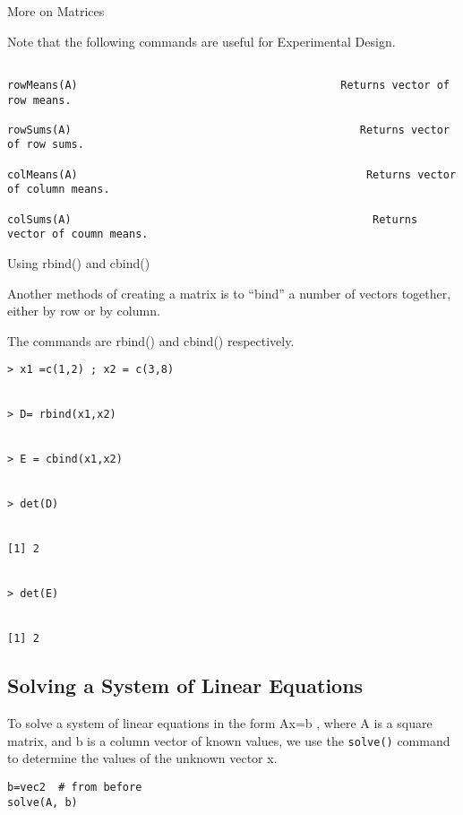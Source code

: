 More on Matrices

 

Note that the following commands are useful for Experimental Design.

 
\begin{framed}
\begin{verbatim}

rowMeans(A)                                         Returns vector of row means.

rowSums(A)                                             Returns vector of row sums. 

colMeans(A)                                             Returns vector of column means. 

colSums(A)                                               Returns vector of coumn means. 
\end{verbatim}
\end{framed}
 



Using rbind() and cbind()

Another methods of creating a matrix is to “bind” a number of vectors together, either by row or by column. 

The commands are rbind() and cbind() respectively.

\begin{framed}
\begin{verbatim}
> x1 =c(1,2) ; x2 = c(3,8)                                                


> D= rbind(x1,x2)


> E = cbind(x1,x2)


> det(D)


[1] 2


> det(E)


[1] 2

 \end{verbatim}
 \end{framed}
\subsection{Solving a System of Linear Equations}


To solve a system of linear equations in the form Ax=b , where A is a square matrix, and b is a column vector of known values, we use the \texttt{solve()} command to determine the values of the unknown vector x.

\begin{framed}
\begin{verbatim}
b=vec2  # from before
solve(A, b) 
\end{verbatim}
\end{framed}




